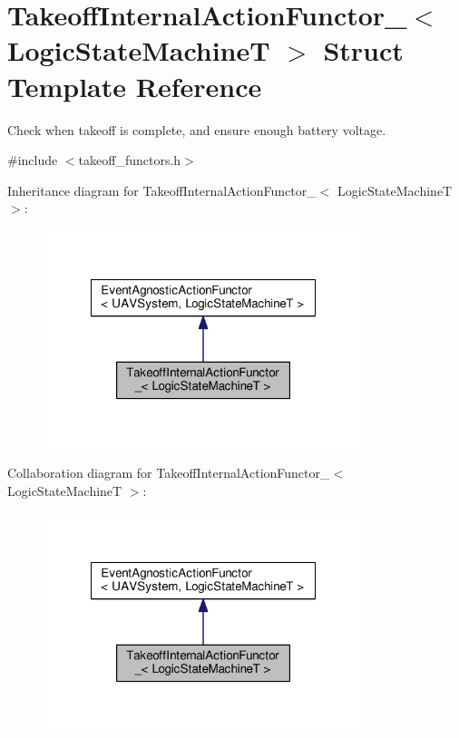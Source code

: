 \hypertarget{structTakeoffInternalActionFunctor__}{\section{Takeoff\-Internal\-Action\-Functor\-\_\-$<$ Logic\-State\-Machine\-T $>$ Struct Template Reference}
\label{structTakeoffInternalActionFunctor__}
}


Check when takeoff is complete, and ensure enough battery voltage.  




{\ttfamily \#include $<$takeoff\-\_\-functors.\-h$>$}



Inheritance diagram for Takeoff\-Internal\-Action\-Functor\-\_\-$<$ Logic\-State\-Machine\-T $>$\-:\nopagebreak
\begin{figure}[H]
\begin{center}
\leavevmode
\includegraphics[width=264pt]{structTakeoffInternalActionFunctor____inherit__graph}
\end{center}
\end{figure}


Collaboration diagram for Takeoff\-Internal\-Action\-Functor\-\_\-$<$ Logic\-State\-Machine\-T $>$\-:\nopagebreak
\begin{figure}[H]
\begin{center}
\leavevmode
\includegraphics[width=264pt]{structTakeoffInternalActionFunctor____coll__graph}
\end{center}
\end{figure}
